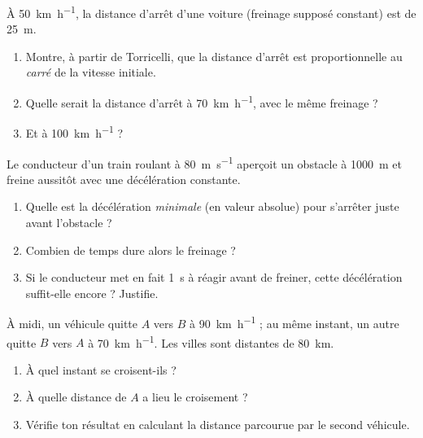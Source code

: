 \documentclass[11pt,a4paper]{article}
\begin{document}

\begin{exo}
À \qty{50}{\kilo\metre\per\hour}, la distance d'arrêt d'une voiture (freinage supposé constant) est de \qty{25}{\metre}.
\begin{enumerate}[label=\alph*)]
  \item Montre, à partir de Torricelli, que la distance d'arrêt est proportionnelle au \emph{carré} de la vitesse initiale.
  \item Quelle serait la distance d'arrêt à \qty{70}{\kilo\metre\per\hour}, avec le même freinage ?
  \item Et à \qty{100}{\kilo\metre\per\hour} ?
\end{enumerate}
\end{exo}

\begin{exo}
Le conducteur d'un train roulant à \qty{80}{\metre\per\second} aperçoit un obstacle à \qty{1000}{\metre}
et freine aussitôt avec une décélération constante.
\begin{enumerate}[label=\alph*)]
  \item Quelle est la décélération \emph{minimale} (en valeur absolue) pour s'arrêter juste avant l'obstacle ?
  \item Combien de temps dure alors le freinage ?
  \item Si le conducteur met en fait \qty{1}{\second} à réagir avant de freiner, cette décélération suffit-elle encore ? Justifie.
\end{enumerate}
\end{exo}

\begin{exo}
À midi, un véhicule quitte $A$ vers $B$ à \qty{90}{\kilo\metre\per\hour} ; au même instant, un autre
quitte $B$ vers $A$ à \qty{70}{\kilo\metre\per\hour}. Les villes sont distantes de \qty{80}{\kilo\metre}.
\begin{enumerate}[label=\alph*)]
  \item À quel instant se croisent-ils ?
  \item À quelle distance de $A$ a lieu le croisement ?
  \item Vérifie ton résultat en calculant la distance parcourue par le second véhicule.
\end{enumerate}
\end{exo}
\end{document}
